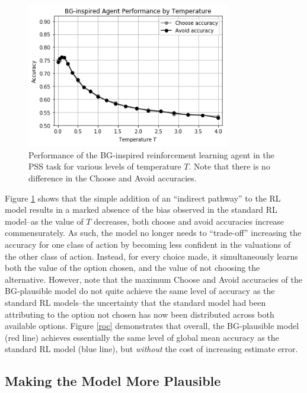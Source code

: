\documentclass[10pt,letterpaper]{article}
\begin{document}
\begin{figure}[ht]
	\begin{center}
		\includegraphics[width=3.5in]{bg-agent-performance.png}
	\end{center}
	\caption{Performance of the BG-inspired reinforcement learning agent in the PSS task for various levels of temperature $T$. Note that there is no difference in the Choose and Avoid accuracies.}
	\label{bg-agents}
\end{figure}

Figure \ref{bg-agents} shows that the simple addition of an ``indirect pathway'' to the RL model results in a marked absence of the bias observed in the standard RL model--as the value of $T$ decreases, both choose and avoid accuracies increase commensurately. As such, the model no longer needs to ``trade-off'' increasing the accuracy for one class of action by becoming less confident in the valuations of the other class of action. Instead, for every choice made, it simultaneously learns both the value of the option chosen, and the value of not choosing the alternative. However, note that the maximum Choose and Avoid accuracies of the BG-plausible model do not quite achieve the same level of accuracy as the standard RL models--the uncertainty that the standard model had been attributing to the option not chosen has now been distributed across both available options.  Figure \ref{roc} demonstrates that overall, the BG-plausible model (red line) achieves essentially the same level of global mean accuracy as the standard RL model (blue line), but \emph{without} the cost of increasing estimate error.  


\subsection{Making the Model More Plausible}
\end{document}
